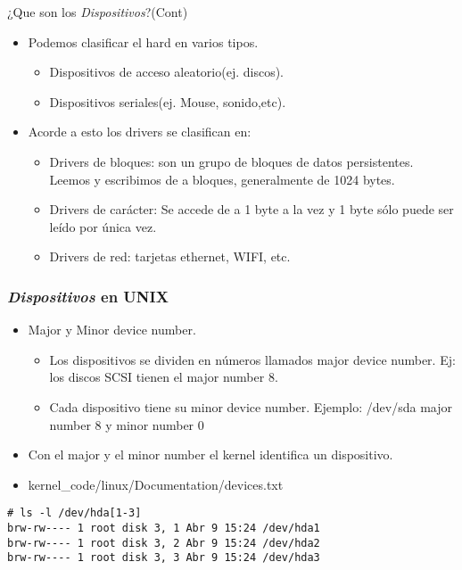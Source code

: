 \begin{frame}{¿Que son los \textit{Dispositivos}?(Cont)}
  \begin{itemize}
	\item Podemos clasificar el hard en varios tipos.
	\begin{itemize}
		\item Dispositivos de acceso aleatorio(ej. discos). 
		\item Dispositivos seriales(ej. Mouse, sonido,etc).
	\end{itemize}	
	\item Acorde a esto los drivers se clasifican en:
     	\begin{itemize}
		\item Drivers de bloques: son un grupo de bloques de datos persistentes. Leemos y escribimos de a bloques, generalmente de 			1024 bytes. 
		\item Drivers de carácter: Se accede de a 1 byte a la vez y 1 byte sólo puede ser leído por única vez.
		\item Drivers de red: tarjetas ethernet, WIFI, etc.
	\end{itemize}	
  \end{itemize}
\end{frame}

\begin{frame}[fragile]
\frametitle{\textit{Dispositivos} en UNIX}  
  \begin{itemize}
	\item Major y Minor device number.
	\begin{itemize}
		\item Los dispositivos se dividen en números llamados major device number. Ej: los discos SCSI tienen el major number 8.
		\item Cada dispositivo tiene su minor device number. Ejemplo: /dev/sda major number 8 y minor number 0 
	\end{itemize}	
	\item Con el major y el minor number el kernel identifica un dispositivo.
	\item kernel\_code/linux/Documentation/devices.txt
  \end{itemize}
\begin{lstlisting}
# ls -l /dev/hda[1-3]
brw-rw---- 1 root disk 3, 1 Abr 9 15:24 /dev/hda1
brw-rw---- 1 root disk 3, 2 Abr 9 15:24 /dev/hda2
brw-rw---- 1 root disk 3, 3 Abr 9 15:24 /dev/hda3
\end{lstlisting}
\end{frame}

